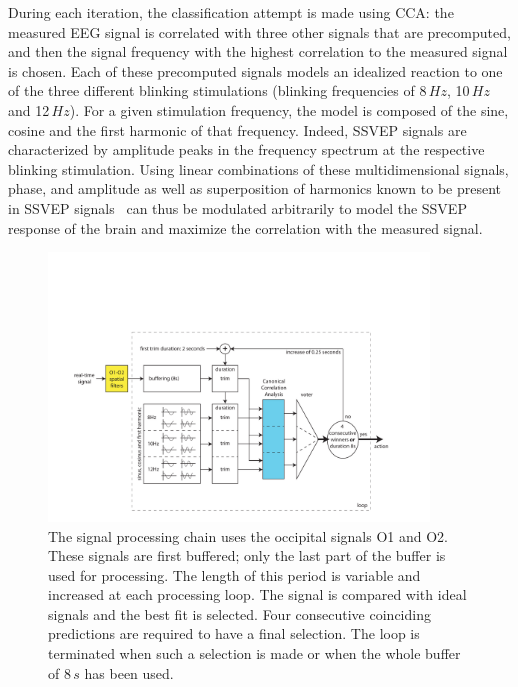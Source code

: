 \documentclass[smallextended]{svjour3}
\begin{document}
During each iteration, the classification attempt is made using CCA: the measured EEG signal is correlated with three other signals that are precomputed, and then the signal frequency with the highest correlation to the measured signal is chosen.
Each of these precomputed signals models an idealized reaction to one of the three different blinking stimulations (blinking frequencies of 8\,$Hz$, 10\,$Hz$ and 12\,$Hz$).
For a given stimulation frequency, the model is composed of the sine, cosine and the first harmonic of that frequency.
Indeed, SSVEP signals are characterized by amplitude peaks in the frequency spectrum at the respective blinking stimulation.
Using linear combinations of these multidimensional signals, phase, and amplitude as well as superposition of harmonics known to be present in SSVEP signals~\cite{herrmann2001} can thus be modulated arbitrarily to model the SSVEP response of the brain and maximize the correlation with the measured signal.

\begin{figure}
\center
\includegraphics[width=0.9\textwidth]{figures/schema-openvibe-cca.pdf}
\caption{The signal processing chain uses the occipital signals O1 and O2. These signals are first buffered; only the last part of the buffer is used for processing. The length of this period is variable and increased at each processing loop. The signal is compared with ideal signals and the best fit is selected. Four consecutive coinciding predictions are required to have a final selection. The loop is terminated when such a selection is made or when the whole buffer of 8\,$s$ has been used.}
\label{fig:schema-openvibe-cca}
\end{figure}
\end{document}
